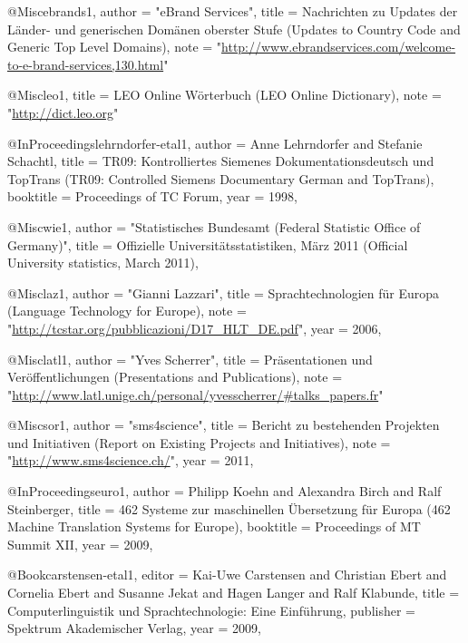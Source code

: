 @Misc{ebrands1,
  author =	 "eBrand Services",
  title =	 {{Nachrichten zu Updates der Länder- und generischen
                  Domänen oberster Stufe (Updates to Country Code and
                  Generic Top Level Domains)}},
  note =         "\url{http://www.ebrandservices.com/welcome-to-e-brand-services,130.html}"
}

@Misc{leo1,
  title =	 {{LEO Online Wörterbuch (LEO Online Dictionary)}},
  note =	 "\url{http://dict.leo.org}"
}


@InProceedings{lehrndorfer-etal1,
  author =	 {Anne Lehrndorfer and Stefanie Schachtl},
  title =	 {{TR09: Kontrolliertes Siemenes Dokumentationsdeutsch
                  und TopTrans (TR09: Controlled Siemens Documentary
                  German and TopTrans)}},
  booktitle =	 {Proceedings of TC Forum},
  year =	 1998,
}


@Misc{wie1,
  author =	 "Statistisches Bundesamt (Federal Statistic Office of
                  Germany)",
  title =	 {{Offizielle Universitätsstatistiken, März 2011
                  (Official University statistics, March 2011)}},
}

@Misc{laz1,
  author =	 "Gianni Lazzari",
  title =	 {{Sprachtechnologien f{\"u}r Europa (Language
                  Technology for Europe)}},
  note =
                  "\url{http://tcstar.org/pubblicazioni/D17_HLT_DE.pdf}",
  year =	 2006,
}

@Misc{latl1,
  author =	 "Yves Scherrer",
  title =	 {{Präsentationen und Veröffentlichungen
                  (Presentations and Publications)}},
  note =
                  "\url{http://www.latl.unige.ch/personal/yvesscherrer/#talks_papers.fr}"
}

@Misc{sor1,
  author =	 "sms4science",
  title =	 {{Bericht zu bestehenden Projekten und Initiativen
                  (Report on Existing Projects and Initiatives)}},
  note =	 "\url{http://www.sms4science.ch/}",
  year =	 2011,
}

@InProceedings{euro1,
  author =	 {Philipp Koehn and Alexandra Birch and Ralf
                  Steinberger},
  title =	 {{462 Systeme zur maschinellen Übersetzung für Europa
                  (462 Machine Translation Systems for Europe)}},
  booktitle =	 {Proceedings of MT Summit XII},
  year =	 2009,
}


@Book{carstensen-etal1,
  editor = 	 {Kai-Uwe Carstensen and Christian Ebert and Cornelia Ebert and Susanne Jekat and Hagen Langer and Ralf Klabunde},
  title = 	 {{Computerlinguistik und Sprachtechnologie: Eine Einführung}},
  publisher = 	 {Spektrum Akademischer Verlag},
  year = 	 {2009},
}




